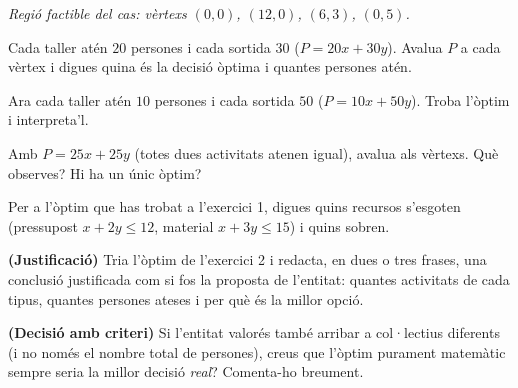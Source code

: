 \noindent\textit{Regió factible del cas: vèrtexs $(0,0)$, $(12,0)$, $(6,3)$, $(0,5)$.}

\begin{exercicis}
\begin{exlist}
  \item Cada taller atén $20$ persones i cada sortida $30$ ($P=20x+30y$). Avalua $P$
        a cada vèrtex i digues quina és la decisió òptima i quantes persones atén.
  \item Ara cada taller atén $10$ persones i cada sortida $50$ ($P=10x+50y$). Troba
        l'òptim i interpreta'l.
  \item Amb $P=25x+25y$ (totes dues activitats atenen igual), avalua als vèrtexs. Què
        observes? Hi ha un únic òptim?
  \item Per a l'òptim que has trobat a l'exercici 1, digues quins recursos s'esgoten
        (pressupost $x+2y\le 12$, material $x+3y\le 15$) i quins sobren.
  \item \textbf{(Justificació)} Tria l'òptim de l'exercici 2 i redacta, en dues o tres
        frases, una conclusió justificada com si fos la proposta de l'entitat: quantes
        activitats de cada tipus, quantes persones ateses i per què és la millor opció.
  \item \textbf{(Decisió amb criteri)} Si l'entitat valorés també arribar a col·lectius
        diferents (i no només el nombre total de persones), creus que l'òptim purament
        matemàtic sempre seria la millor decisió \emph{real}? Comenta-ho breument.
\end{exlist}
\end{exercicis}

